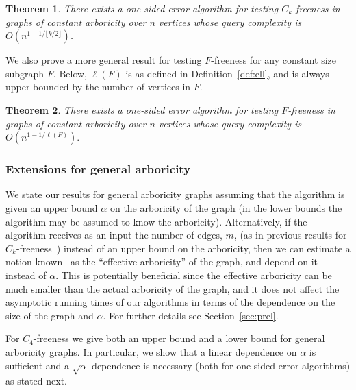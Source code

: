 \documentclass{article}
\newtheorem{theorem}{Theorem}
\newcommand{\commentt}[1]{ {}}
\newcommand{\SodaReb}[1]{{ #1}}
\begin{document}
\begin{theorem}\label{thm:Ck-ub-intro}
There exists a one-sided error algorithm for testing $C_k$-freeness in graphs of constant arboricity over $n$ vertices whose query complexity %
is $O(n^{1-1/\lfloor k/2 \rfloor })$. 
\end{theorem}

\SodaReb{
We also prove a more general result for testing $F$-freeness for any constant size subgraph $F$. Below, $\ell(F)$ is as defined in Definition~\ref{def:ell}, and is always upper bounded by the number of vertices in $F$.}

\begin{theorem}\label{thm:Gen-F-ub-intro}
\SodaReb{There exists  a one-sided error algorithm for testing  $F$-freeness in graphs of constant arboricity over $n$ vertices whose query complexity is $O(n^{1-1/\ell(F)}).$}
\end{theorem}


 \subsubsection{Extensions for general arboricity}


We state our results for general arboricity graphs assuming that the algorithm is given an 
upper bound $\alpha$ on the arboricity of the graph (in  the lower bounds the algorithm may be assumed to know the arboricity).
Alternatively,
if the algorithm receives as an input the number of edges, $m$, (as in previous results for $C_k$-freeness~\cite{AKKR08, Reut}) instead of an upper bound on the arboricity, then we can estimate a notion known~\cite{Reut} as the ``effective arboricity'' of the graph, and depend on it instead of $\alpha$. This is potentially beneficial since the effective arboricity can be much smaller than the actual arboricity of the graph, \SodaReb{and it does not affect the asymptotic running times of our algorithms in terms of the dependence on the size of the graph and $\alpha$}. For further details see Section~\ref{sec:prel}.

For $C_4$-freeness we give both an upper bound and a lower bound for general arboricity graphs. In particular, we show that a linear dependence on $\alpha$ is sufficient and a $\sqrt{\alpha}$-dependence is necessary (both for one-sided error algorithms) as stated next.
\end{document}
